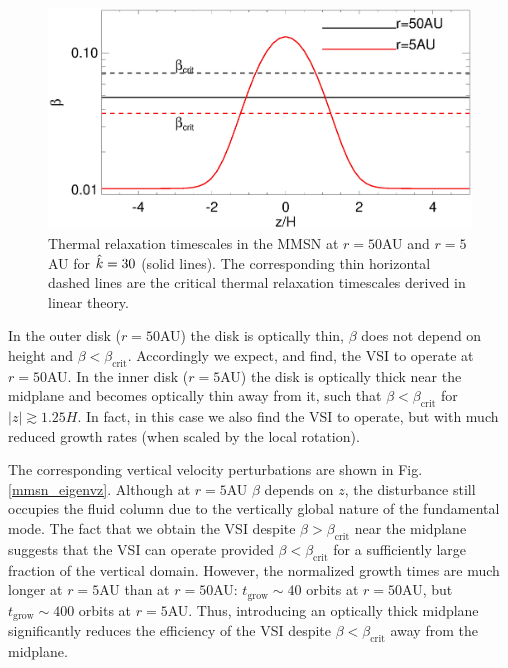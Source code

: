  \begin{figure}
  \includegraphics[width=\linewidth,clip=true,trim=0cm 0cm 0cm
  0cm]{figures/beta_compare}
  \caption{Thermal relaxation timescales in the MMSN at $r=50$AU
     and $r=5$AU for $\hat{k}=30$ (solid lines). The
    corresponding thin horizontal dashed lines are the critical thermal
    relaxation timescales derived in linear theory. 
    \label{beta_compare}}
\end{figure}

In the outer disk ($r=50$AU) the disk is optically thin, $\beta$ 
does not depend on height and $\beta <
\beta_\mathrm{crit}$. Accordingly we expect, and find, the VSI to
operate at $r=50$AU. In the inner disk ($r=5$AU) the disk is optically
thick near the midplane and becomes optically thin away from it, such
that $\beta < \beta_\mathrm{crit}$ for $|z|\gtrsim1.25H$. In
fact, in this case  we also find the VSI to operate, but with much
reduced growth rates (when scaled by the local 
rotation). 

The corresponding vertical velocity perturbations are shown in 
Fig. \ref{mmsn_eigenvz}. Although at $r=5$AU $\beta$ depends on $z$,
the disturbance still occupies the fluid column due to the vertically
global nature of the fundamental mode. The fact that
we obtain the VSI despite $\beta > \beta_\mathrm{crit}$ near the
midplane suggests that the VSI can operate 
provided $\beta < \beta_\mathrm{crit}$ for a sufficiently large
fraction of the vertical domain. However, the normalized growth times
are much longer at $r=5$AU than at $r=50$AU: %
$t_\mathrm{grow}\sim 40$ orbits at $r=50$AU, but $t_\mathrm{grow}\sim
400$ orbits at $r=5$AU. Thus, introducing an optically thick midplane
significantly reduces the efficiency of the VSI despite $\beta <
\beta_\mathrm{crit}$ away from the midplane.    



